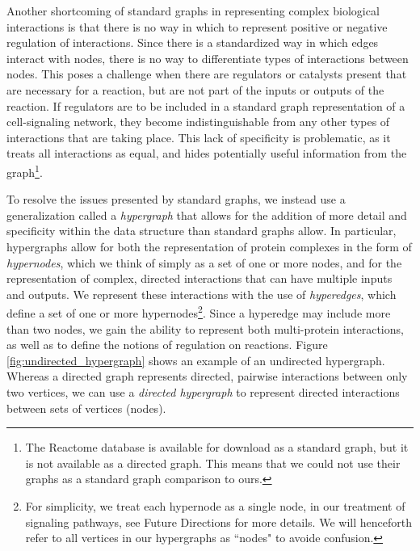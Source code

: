 \documentclass[12pt,twoside]{reedthesis}
\theoremstyle{definition}
\begin{document}
Another shortcoming of standard graphs in representing complex biological interactions is that there is no way in which to represent positive or negative regulation of interactions.  Since there is a standardized way in which edges interact with nodes, there is no way to differentiate types of interactions between nodes.  This poses a challenge when there are regulators or catalysts present that are necessary for a reaction, but are not part of the inputs or outputs of the reaction.  If regulators are to be included in a standard graph representation of a cell-signaling network, they become indistinguishable from any other types of interactions that are taking place.  This lack of specificity is problematic, as it treats all interactions as equal, and hides potentially useful information from the graph\footnote{The Reactome database is available for download as a standard graph, but it is not available as a directed graph. This means that we could not use their graphs as a standard graph comparison to ours.}.\par

To resolve the issues presented by standard graphs, we instead use a generalization called a \textit{hypergraph} that allows for the addition of more detail  and specificity within the data structure than standard graphs allow.  In particular, hypergraphs allow for both the representation of protein complexes in the form of \textit{hypernodes}, which we think of simply as a set of one or more nodes, and for the representation of complex, directed interactions that can have multiple inputs and outputs.  We represent these interactions with the use of \textit{hyperedges}, which define a set of one or more hypernodes\footnote{For simplicity, we treat each hypernode as a single node, in our treatment of signaling pathways, see Future Directions for more details. We will henceforth refer to all vertices in our hypergraphs as ``nodes" to avoide confusion.}.  Since a hyperedge may include more than two nodes, we gain the ability to represent both multi-protein interactions, as well as to define the notions of regulation on reactions. Figure \ref{fig:undirected_hypergraph} shows an example of an undirected hypergraph. Whereas a directed graph represents directed, pairwise interactions between only two vertices, we can use a \textit{directed hypergraph} to represent directed interactions between sets of vertices (nodes). \par
\end{document}
